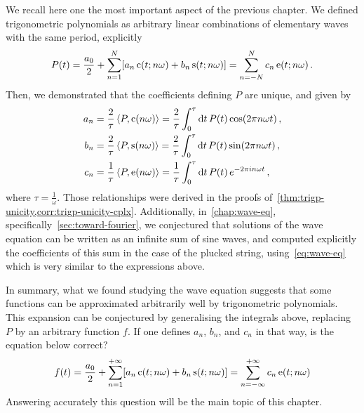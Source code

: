 We recall here one the most important aspect of the previous chapter. We defined
trigonometric polynomials as arbitrary linear combinations of elementary waves with the
same period, explicitly
\begin{equation}
  P(t)=\frac{a_0}{2}+\sum_{n=1}^N[a_n\operatorname{c}(t;n\omega)+b_n\operatorname{s}(t;n\omega)]=
  \sum_{n=-N}^{N}c_n\operatorname{e}(t;n\omega)\,.
\end{equation}
Then, we demonstrated that the coefficients defining $P$ are unique, and given by
\begin{align}
  a_n&=\frac{2}{\tau}\braket{P,\operatorname{c}(n\omega)}
  =\frac{2}{\tau}\int_0^{\tau}\mathrm{d} t\,P(t)\cos(2\pi n\omega t)\,,
  \label{eq:series-an-intro}\\
  b_n&=\frac{2}{\tau}\braket{P,\operatorname{s}(n\omega)}
  =\frac{2}{\tau}\int_0^{\tau}\mathrm{d} t\,P(t)\sin(2\pi n\omega t)\,,
  \label{eq:series-bn-intro}\\
  c_n&=\frac{1}{\tau}\braket{P,\operatorname{e}(n\omega)}
  =\frac{1}{\tau}\int_0^{\tau}\mathrm{d} t\,P(t)\,e^{-2\pi i n\omega t}\,,
  \label{eq:series-cn-intro}
\end{align}
where $\tau=\frac{1}{\omega}$. Those relationships were derived in the proofs
of~\cref{thm:trigp-unicity,corr:trigp-unicity-cplx}. Additionally, in~\cref{chap:wave-eq},
specifically~\cref{sec:toward-fourier}, we conjectured that solutions of the wave equation
can be written as an infinite sum of sine waves, and computed explicitly the coefficients
of this sum in the case of the plucked string, using~\cref{eq:wave-eq} which is very
similar to the expressions above.

In summary, what we found studying the wave equation suggests that some functions can be
approximated arbitrarily well by trigonometric polynomials. This expansion can be
conjectured by generalising the integrals above, replacing $P$ by an arbitrary function
$f$. If one defines $a_n$, $b_n$, and $c_n$ in that way, is the equation below correct?
\begin{equation}
  f(t)=\frac{a_0}{2}+\sum_{n=1}^{+\infty}[a_n\operatorname{c}(t;n\omega)+b_n\operatorname{s}(t;n\omega)]=
  \sum_{n=-\infty}^{+\infty}c_n\operatorname{e}(t;n\omega)
\end{equation}
Answering accurately this question will be the main topic of this chapter.
